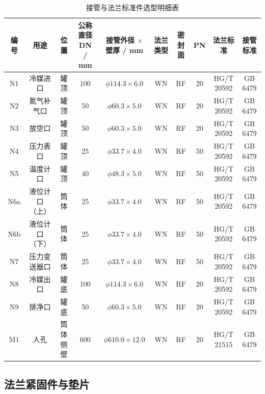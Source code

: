 \begin{landscape}
\begin{table}[htbp]
  \centering
  \caption{接管与法兰标准件选型明细表}
  \label{tab:cad-nozzle-flange}
  \small\renewcommand{\arraystretch}{1.3}
  \setlength{\tabcolsep}{3.5pt}
  \begin{tabularx}{\linewidth}{@{}c c c c c c c c c c@{}}
    \toprule
    \textbf{编号} & \textbf{用途} & \textbf{位置} & \textbf{公称直径 DN / mm} & \textbf{接管外径 $\times$ 壁厚 / mm} & \textbf{法兰类型} & \textbf{密封面} & \textbf{PN} & \textbf{法兰标准} & \textbf{接管标准} \\
    \midrule
    N1  & 冷媒进口    & 罐顶     & 100 & $\phi 114.3 \times 6.0$  & WN & RF & 20 & HG/T 20592 & GB 6479 \\
    N2  & 氮气补气口  & 罐顶     & 50  & $\phi 60.3 \times 5.0$   & WN & RF & 20 & HG/T 20592 & GB 6479 \\
    N3  & 放空口      & 罐顶     & 50  & $\phi 60.3 \times 5.0$   & WN & RF & 20 & HG/T 20592 & GB 6479 \\
    N4  & 压力表口    & 罐顶     & 25  & $\phi 33.7 \times 4.0$   & WN & RF & 50 & HG/T 20592 & GB 6479 \\
    N5  & 温度计口    & 罐顶     & 40  & $\phi 48.3 \times 5.0$   & WN & RF & 50 & HG/T 20592 & GB 6479 \\
    N6a & 液位计口（上）& 筒体   & 25  & $\phi 33.7 \times 4.0$   & WN & RF & 50 & HG/T 20592 & GB 6479 \\
    N6b & 液位计口（下）& 筒体   & 25  & $\phi 33.7 \times 4.0$   & WN & RF & 50 & HG/T 20592 & GB 6479 \\
    N7  & 压力变送器口 & 筒体    & 25  & $\phi 33.7 \times 4.0$   & WN & RF & 50 & HG/T 20592 & GB 6479 \\
    N8  & 冷媒出口    & 罐底     & 100 & $\phi 114.3 \times 6.0$  & WN & RF & 20 & HG/T 20592 & GB 6479 \\
    N9  & 排净口      & 罐底     & 50  & $\phi 60.3 \times 5.0$   & WN & RF & 20 & HG/T 20592 & GB 6479 \\
    M1  & 人孔        & 筒体侧壁 & 600 & $\phi 610.0 \times 12.0$ & WN & RF & 20 & HG/T 21515 & GB 6479 \\
    \bottomrule
  \end{tabularx}
\end{table}
\end{landscape}

\subsection{法兰紧固件与垫片}

